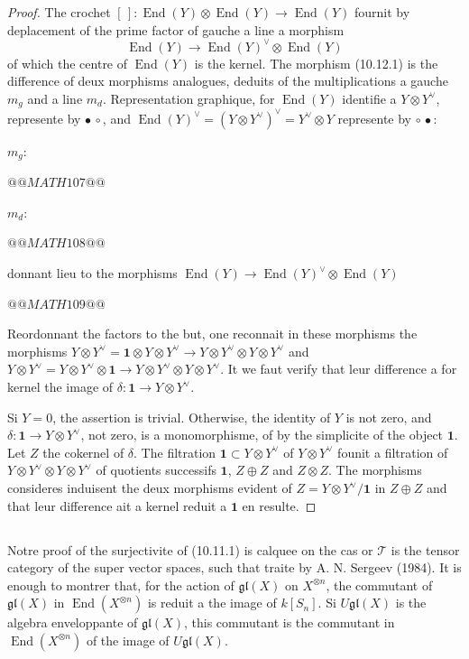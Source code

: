 \documentclass[11pt,a4paper]{article}
\theoremstyle{plain}
\theoremstyle{definition}
\DeclareMathOperator{\End}{End}
\begin{document}
\begin{proof}
The crochet $[\,] : \End(Y) \otimes \End(Y) \to \End(Y)$ fournit by deplacement of the prime factor of gauche a line a morphism
\begin{equation}
\End(Y) \to \End(Y)^\vee \otimes \End(Y) \tag{10.12.1}
\end{equation}
of which the centre of $\End(Y)$ is the kernel. The morphism (10.12.1) is the difference of deux morphisms analogues, deduits of the multiplications a gauche $m_g$ and a line $m_d$. Representation graphique, for $\End(Y)$ identifie a $Y \otimes Y^\vee$, represente by $\bullet\,\circ$, and $\End(Y)^\vee = (Y \otimes Y^\vee)^\vee = Y^\vee \otimes Y$ represente by $\circ\,\bullet$:

$m_g$:
\begin{center}
$@@MATH107@@$
\end{center}
$m_d$:
\begin{center}
$@@MATH108@@$
\end{center}
donnant lieu to the morphisms $\End(Y) \to \End(Y)^\vee \otimes \End(Y)$

\begin{center}
$@@MATH109@@$
\end{center}

Reordonnant the factors to the but, one reconnait in these morphisms the morphisms $Y \otimes Y^\vee = \mathbf{1} \otimes Y \otimes Y^\vee \to Y \otimes Y^\vee \otimes Y \otimes Y^\vee$ and $Y \otimes Y^\vee = Y \otimes Y^\vee \otimes \mathbf{1} \to Y \otimes Y^\vee \otimes Y \otimes Y^\vee$. It we faut verify that leur difference a for kernel the image of $\delta : \mathbf{1} \to Y \otimes Y^\vee$.

Si $Y = 0$, the assertion is trivial. Otherwise, the identity of $Y$ is not zero, and $\delta : \mathbf{1} \to Y \otimes Y^\vee$, not zero, is a monomorphisme, of by the simplicite of the object $\mathbf{1}$. Let $Z$ the cokernel of $\delta$. The filtration $\mathbf{1} \subset Y \otimes Y^\vee$ of $Y \otimes Y^\vee$ founit a filtration of $Y \otimes Y^\vee \otimes Y \otimes Y^\vee$ of quotients successifs $\mathbf{1}$, $Z \oplus Z$ and $Z \otimes Z$. The morphisms consideres induisent the deux morphisms evident of $Z = Y \otimes Y^\vee / \mathbf{1}$ in $Z \oplus Z$ and that leur difference ait a kernel reduit a $\mathbf{1}$ en resulte.
\end{proof}

\subsection{}
Notre proof of the surjectivite of (10.11.1) is calquee on the cas or $\mathcal{T}$ is the tensor category of the super vector spaces, such that traite by A. N. Sergeev (1984). It is enough to montrer that, for the action of $\mathfrak{gl}(X)$ on $X^{\otimes n}$, the commutant of $\mathfrak{gl}(X)$ in $\End(X^{\otimes n})$ is reduit a the image of $k[S_n]$. Si $U\mathfrak{gl}(X)$ is the algebra enveloppante of $\mathfrak{gl}(X)$, this commutant is the commutant in $\End(X^{\otimes n})$ of the image of $U\mathfrak{gl}(X)$.
\end{document}
